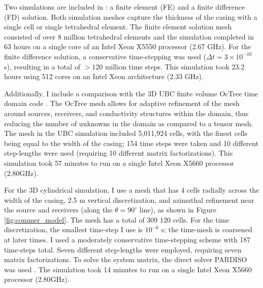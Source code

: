 Two simulations are included in \cite{Commer2015}: a finite element (FE) and a finite difference (FD) solution. Both simulation meshes capture the thickness of the casing with a single cell or single tetrahedral element. The finite element solution mesh consisted of over 8 million tetrahedral elements and the simulation completed in 63 hours on a single core of an Intel Xeon X5550 processor (2.67 GHz). For the finite difference solution, a conservative time-stepping was used ($\Delta t = 3 \times 10^{-10}$ s), resulting in a total of $>$120 million time steps. This simulation took 23.2 hours using 512 cores on an Intel Xeon architecture (2.33 GHz).

Additionally, I include a comparison with the 3D UBC finite volume OcTree time domain code \citep{Haber2007}. The OcTree mesh allows for adaptive refinement of the mesh around sources, receivers, and conductivity structures within the domain, thus reducing the number of unknowns in the domain as compared to a tensor mesh. The mesh in the UBC simulation included 5,011,924 cells, with the finest cells being equal to the width of the casing; 154 time steps were taken and 10 different step-lengths were used (requiring 10 different matrix factorizations). This simulation took 57 minutes to run on a single Intel Xeon X5660 processor (2.80GHz).

For the 3D cylindrical simulation, I use a mesh that has 4 cells radially across the width of the casing, 2.5 m vertical discretization, and azimuthal refinement near the source and receivers (along the $\theta=90^\circ$ line), as shown in Figure \ref{fig:commer_model}. The mesh has a total of 309 120 cells. For the time discretization, the smallest time-step I use is $10^{-6}$ s; the time-mesh is coarsened at later times. I used a moderately conservative time-stepping scheme with 187 time-steps total. Seven different step-lengths were employed, requiring seven matrix factorizations. To solve the system matrix, the direct solver PARDISO was used \citep{Petra2014, Cosmin2016}. The simulation took 14 minutes to run on a single Intel Xeon X5660 processor (2.80GHz).






